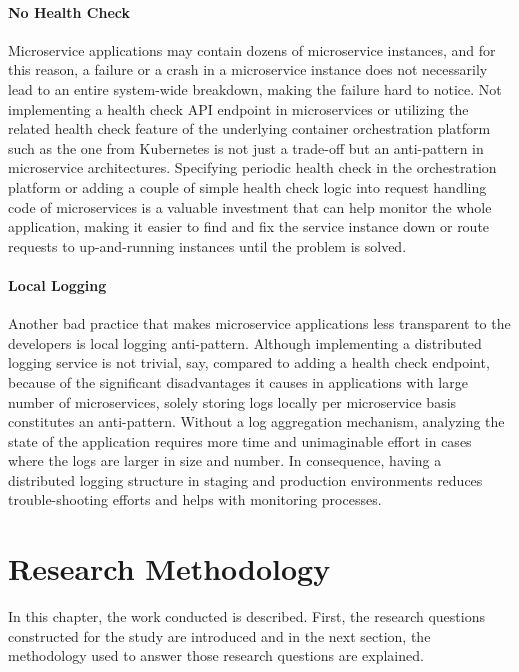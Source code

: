 \documentclass{Configuration_Files/PoliMi3i_thesis}
\begin{document}
\subsubsection{No Health Check}
\label{subsubsec:no_health_check}

Microservice applications may contain dozens of microservice instances, and for this reason, a failure or a crash in a microservice instance does not necessarily lead to an entire system-wide breakdown, making the failure hard to notice.
Not implementing a health check API endpoint in microservices or utilizing the related health check feature of the underlying container orchestration platform such as the one from Kubernetes is not just a trade-off but an anti-pattern in microservice architectures.
Specifying periodic health check in the orchestration platform or adding a couple of simple health check logic into request handling code of microservices is a valuable investment that can help monitor the whole application, making it easier to find and fix the service instance down or route requests to up-and-running instances until the problem is solved.

\subsubsection{Local Logging}
\label{subsubsec:local_logging}

Another bad practice that makes microservice applications less transparent to the developers is local logging anti-pattern.
Although implementing a distributed logging service is not trivial, say, compared to adding a health check endpoint, because of the significant disadvantages it causes in applications with large number of microservices, solely storing logs locally per microservice basis constitutes an anti-pattern.
Without a log aggregation mechanism, analyzing the state of the application requires more time and unimaginable effort in cases where the logs are larger in size and number.
In consequence, having a distributed logging structure in staging and production environments reduces trouble-shooting efforts and helps with monitoring processes.

\chapter{Research Methodology}
\label{ch:research_method}%

In this chapter, the work conducted is described.
First, the research questions constructed for the study are introduced and in the next section, the methodology used to answer those research questions are explained.
\end{document}
